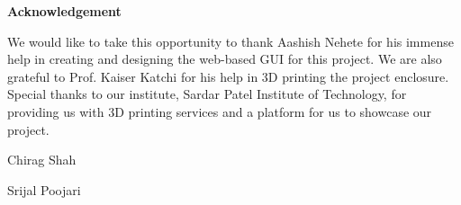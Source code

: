 \newpage
\thispagestyle{empty}
\vspace*{3in}
\begin{normalsize}
	
\centerline{\textbf{Acknowledgement}}
\vspace{2cm}
\end{normalsize}

\par We would like to take this opportunity to thank Aashish Nehete for his immense help in creating and designing the web-based GUI for this project. We are also grateful to Prof. Kaiser Katchi for his help in 3D printing the project enclosure.
Special thanks to our institute, Sardar Patel Institute of Technology, for providing us with 3D printing services and a platform for us to showcase our project.

\vspace{2cm}

\hspace*{4in}  Chirag Shah

\hspace*{4in}  Srijal Poojari
